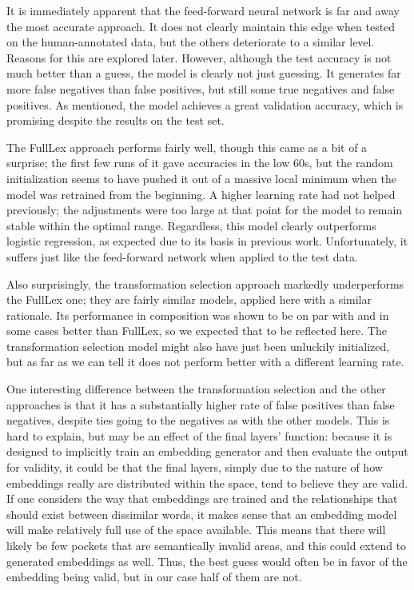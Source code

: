 \documentclass[a4paper, 12pt]{article}
\begin{document}
It is immediately apparent that the feed-forward neural network is far and away the most accurate approach. It does not clearly maintain this edge when tested on the human-annotated data, but the others deteriorate to a similar level. Reasons for this are explored later. However, although the test accuracy is not much better than a guess, the model is clearly not just guessing. It generates far more false negatives than false positives, but still some true negatives and false positives. As mentioned, the model achieves a great validation accuracy, which is promising despite the results on the test set.

The FullLex approach performs fairly well, though this came as a bit of a surprise; the first few runs of it gave accuracies in the low 60s, but the random initialization seems to have pushed it out of a massive local minimum when the model was retrained from the beginning. A higher learning rate had not helped previously; the adjustments were too large at that point for the model to remain stable within the optimal range. Regardless, this model clearly outperforms logistic regression, as expected due to its basis in previous work. Unfortunately, it suffers just like the feed-forward network when applied to the test data.

Also surprisingly, the transformation selection approach markedly underperforms the FullLex one; they are fairly similar models, applied here with a similar rationale. Its performance in composition was shown to be on par with and in some cases better than FullLex, so we expected that to be reflected here. The transformation selection model might also have just been unluckily initialized, but as far as we can tell it does not perform better with a different learning rate.

One interesting difference between the transformation selection and the other approaches is that it has a substantially higher rate of false positives than false negatives, despite ties going to the negatives as with the other models. This is hard to explain, but may be an effect of the final layers' function: because it is designed to implicitly train an embedding generator and then evaluate the output for validity, it could be that the final layers, simply due to the nature of how embeddings really are distributed within the space, tend to believe they are valid. If one considers the way that embeddings are trained and the relationships that should exist between dissimilar words, it makes sense that an embedding model will make relatively full use of the space available. This means that there will likely be few pockets that are semantically invalid areas, and this could extend to generated embeddings as well. Thus, the best guess would often be in favor of the embedding being valid, but in our case half of them are not.
\end{document}
